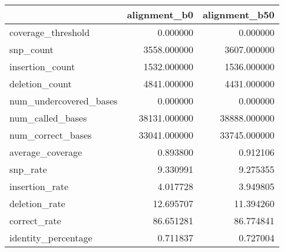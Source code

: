 \begin{tabular}{lrr}
\toprule
{} &  alignment\_b0 &  alignment\_b50 \\
\midrule
coverage\_threshold     &      0.000000 &       0.000000 \\
snp\_count              &   3558.000000 &    3607.000000 \\
insertion\_count        &   1532.000000 &    1536.000000 \\
deletion\_count         &   4841.000000 &    4431.000000 \\
num\_undercovered\_bases &      0.000000 &       0.000000 \\
num\_called\_bases       &  38131.000000 &   38888.000000 \\
num\_correct\_bases      &  33041.000000 &   33745.000000 \\
average\_coverage       &      0.893800 &       0.912106 \\
snp\_rate               &      9.330991 &       9.275355 \\
insertion\_rate         &      4.017728 &       3.949805 \\
deletion\_rate          &     12.695707 &      11.394260 \\
correct\_rate           &     86.651281 &      86.774841 \\
identity\_percentage    &      0.711837 &       0.727004 \\
\bottomrule
\end{tabular}
